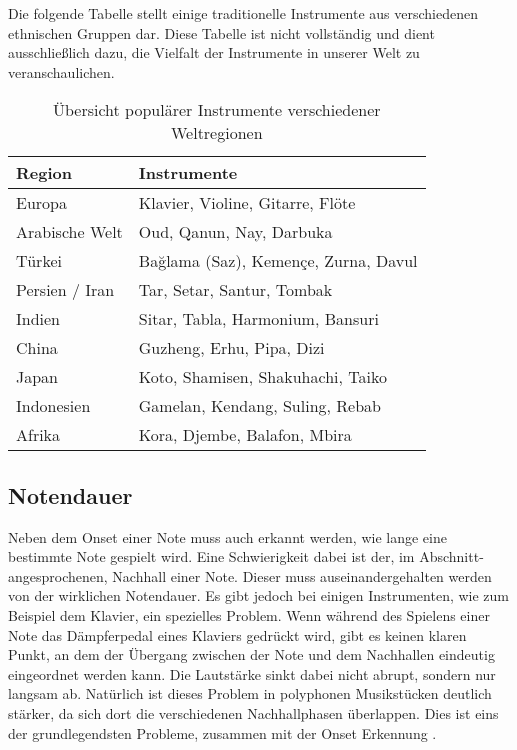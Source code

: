 Die folgende Tabelle stellt einige traditionelle Instrumente aus verschiedenen ethnischen Gruppen dar.
Diese Tabelle ist nicht vollständig und dient ausschließlich dazu,
die Vielfalt der Instrumente in unserer Welt zu veranschaulichen.
\begin{table}[H]
\centering
\begin{tabular}{|l|p{10cm}|}
\hline
\textbf{Region} & \textbf{Instrumente} \\ \hline
Europa & Klavier, Violine, Gitarre, Flöte \\ \hline
Arabische Welt & Oud, Qanun, Nay, Darbuka \\ \hline
Türkei & Bağlama (Saz), Kemençe, Zurna, Davul \\ \hline
Persien / Iran & Tar, Setar, Santur, Tombak \\ \hline
Indien & Sitar, Tabla, Harmonium, Bansuri \\ \hline
China & Guzheng, Erhu, Pipa, Dizi \\ \hline
Japan & Koto, Shamisen, Shakuhachi, Taiko \\ \hline
Indonesien & Gamelan, Kendang, Suling, Rebab \\ \hline
Afrika & Kora, Djembe, Balafon, Mbira \\ \hline
\end{tabular}
\caption{Übersicht populärer Instrumente verschiedener Weltregionen}
\end{table}

\subsection{Notendauer}
Neben dem Onset einer Note muss auch erkannt werden, wie lange eine bestimmte Note gespielt wird.
Eine Schwierigkeit dabei ist der, im Abschnitt- angesprochenen, Nachhall einer Note.
Dieser muss auseinandergehalten werden von der wirklichen Notendauer.
Es gibt jedoch bei einigen Instrumenten, wie zum Beispiel dem Klavier, ein spezielles Problem.
Wenn während des Spielens einer Note das Dämpferpedal eines Klaviers gedrückt wird, gibt es keinen klaren Punkt,
an dem der Übergang zwischen der Note und dem Nachhallen eindeutig eingeordnet werden kann.
Die Lautstärke sinkt dabei nicht abrupt, sondern nur langsam ab.
Natürlich ist dieses Problem in polyphonen Musikstücken deutlich stärker,
da sich dort die verschiedenen Nachhallphasen überlappen.
Dies ist eins der grundlegendsten Probleme, zusammen mit der Onset Erkennung \cite{jamshidi2024machine}.

